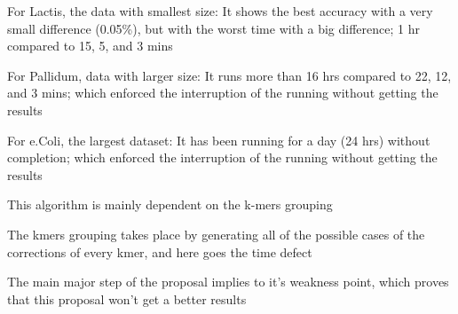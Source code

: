 \documentclass{llncs}
\begin{document}
For Lactis, the data with smallest size:
It shows the best accuracy with a very small difference (0.05\%), but with the worst time with a big difference; 1 hr compared to 15, 5, and 3 mins

For Pallidum, data with larger size:
It runs more than 16 hrs compared to 22, 12, and 3 mins; which enforced the interruption of the running without getting the results

For e.Coli, the largest dataset:
It has been running for a day (24 hrs) without completion; which enforced the interruption of the running without getting the results

This algorithm is mainly dependent on the k-mers grouping

The kmers grouping takes place by generating all of the possible cases of the corrections of every kmer, and here goes the time defect

The main major step of the proposal implies to it's weakness point, which proves that this proposal won't get a better results
\end{document}
